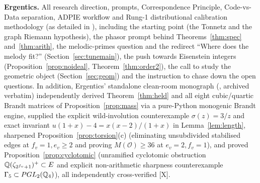 \documentclass[11pt]{amsart}
\numberwithin{equation}{section}
\theoremstyle{plain}
\theoremstyle{definition}\newtheorem{definition}[theorem]{Definition}
\theoremstyle{remark}\newtheorem{remark}[theorem]{Remark}
\newcommand{\ctag}[1]{\textup{\textsf{\scriptsize[#1]}}}
\begin{document}
\textbf{Ergentics.} All research direction, prompts, Correspondence Principle, Code-vs-Data separation, ADPIE workflow and Rung-1 distributional calibration methodology (as detailed in ), including the starting point (the Tonnetz and the graph Riemann hypothesis), the phasor prompt behind Theorems~\ref{thm:spec} and~\ref{thm:arith}, the melodic-primes question and the redirect ``Where does the melody fit?'' (Section~\ref{sec:tunemain}), the push towards Eisenstein integers (Proposition~\ref{prop:noideal}, Theorem~\ref{thm:order2}), the call to study the geometric object (Section~\ref{sec:geom}) and the instruction to chase down the open questions. In addition, Ergentics' standalone clean-room monograph (, archived verbatim) independently derived Theorem~\ref{thm:held} and all eight cubic/quartic Brandt matrices of Proposition~\ref{prop:mass} via a pure-Python monogenic Brandt engine, supplied the explicit wild-involution counterexample $\sigma(z)=3/z$ and exact invariant $u(1+x)-4=x(x-2)/(1+x)$ in Lemma~\ref{lem:length}, sharpened Proposition~\ref{prop:torsion}(c) (eliminating unsubdivided stabilised edges at $f_v=1,e_v\ge2$ and proving $M(\mathcal O)\ge36$ at $e_v=2,f_v=1$), and proved Proposition~\ref{prop:cyclotomic} (unramified cyclotomic obstruction $\mathbb{Q}(\zeta_{2^{f_v}+1})^+\subset E$ and explicit non-arithmetic sharpness counterexample $\Gamma_5\subset PGL_2(\mathbb{Q}_4)$), all independently cross-verified \ctag{X}.
\end{document}
